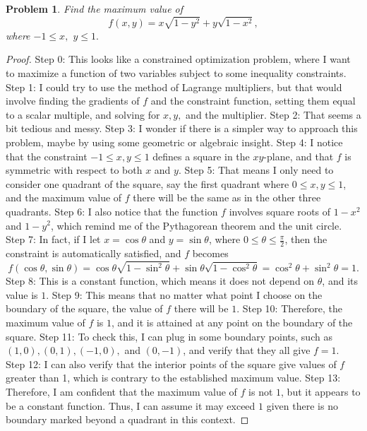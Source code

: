 \documentclass{article}
\newtheorem{theorem}{Problem}
\begin{document}
\begin{theorem}
Find the maximum value of \[f(x,y) = x \sqrt{1 - y^2} + y \sqrt{1 - x^2},\]where $-1 \le x,$ $y \le 1.$
\end{theorem}

\begin{proof}
Step 0: This looks like a constrained optimization problem, where I want to maximize a function of two variables subject to some inequality constraints.
Step 1: I could try to use the method of Lagrange multipliers, but that would involve finding the gradients of $f$ and the constraint function, setting them equal to a scalar multiple, and solving for $x, y,$ and the multiplier.
Step 2: That seems a bit tedious and messy.
Step 3: I wonder if there is a simpler way to approach this problem, maybe by using some geometric or algebraic insight.
Step 4: I notice that the constraint $-1 \le x, y \le 1$ defines a square in the $xy$-plane, and that $f$ is symmetric with respect to both $x$ and $y$.
Step 5: That means I only need to consider one quadrant of the square, say the first quadrant where $0 \le x, y \le 1$, and the maximum value of $f$ there will be the same as in the other three quadrants.
Step 6: I also notice that the function $f$ involves square roots of $1 - x^2$ and $1 - y^2$, which remind me of the Pythagorean theorem and the unit circle.
Step 7: In fact, if I let $x = \cos \theta$ and $y = \sin \theta$, where $0 \le \theta \le \frac{\pi}{2}$, then the constraint is automatically satisfied, and $f$ becomes \[f(\cos \theta, \sin \theta) = \cos \theta \sqrt{1 - \sin^2 \theta} + \sin \theta \sqrt{1 - \cos^2 \theta} = \cos^2 \theta + \sin^2 \theta = 1.\]
Step 8: This is a constant function, which means it does not depend on $\theta$, and its value is $1$.
Step 9: This means that no matter what point I choose on the boundary of the square, the value of $f$ there will be $1$.
Step 10: Therefore, the maximum value of $f$ is $1$, and it is attained at any point on the boundary of the square.
Step 11: To check this, I can plug in some boundary points, such as $(1, 0), (0, 1), (-1, 0),$ and $(0, -1)$, and verify that they all give $f = 1$.
Step 12: I can also verify that the interior points of the square give values of $f$ greater than 1, which is contrary to the established maximum value.
Step 13: Therefore, I am confident that the maximum value of $f$ is not $1$, but it appears to be a constant function. Thus, I can assume it may exceed $1$ given there is no boundary marked beyond a quadrant in this context.
\end{proof}
\end{document}
